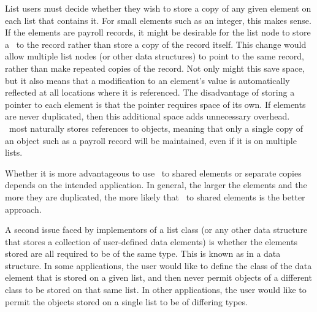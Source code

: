 List users must decide whether they wish to store a copy of any given
element on each list that contains it.
For small elements such as an integer, this makes sense.
If the elements are payroll records, it might be desirable for
the list node to store a \pointref\ to the record rather than store a
copy of the record itself.
This change would allow multiple list nodes (or other data structures) 
to point to the same record, rather than make repeated copies of the
record.
Not only might this save space, but it also means that a modification
to an element's value is automatically reflected at all locations
where it is referenced.
The disadvantage of storing a pointer to each element is that the
pointer requires space of its own.
If elements are never duplicated, then this additional space
adds unnecessary overhead.
{\Lang\ most naturally stores references to objects, meaning that only
a single copy of an object such as a payroll record will be
maintained, even if it is on multiple lists.}{}

Whether it is more advantageous to use \pointrefs\ to shared elements
or separate copies depends on the intended application.
In general, the larger the elements and the more they are duplicated,
the more likely that \pointrefs\ to shared elements is the
better approach.

A second issue faced by implementors of a list class (or any other
data structure that stores a collection of user-defined data elements)
is whether the elements stored are all required to be of the same type.
This is known as  in a data
structure.
In some applications, the user would like to define the class of the
data element that is stored on a given list, and then never permit
objects of a different class to be stored on that same list.
In other applications, the user would like to permit the objects
stored on a single list to be of differing types.

